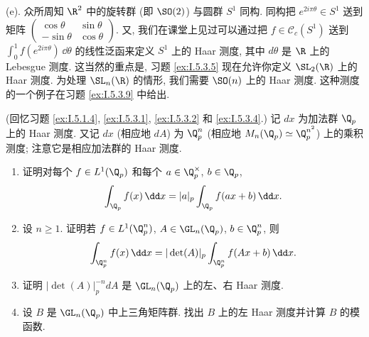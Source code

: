 \begin{solution}
(e). 众所周知 $\R^2$ 中的旋转群 (即 $\SO(2)$) 与圆群 $S^1$ 同构. 同构把 $e^{2i\pi\theta} \in S^1$ 送到矩阵 $\begin{pmatrix} \cos\theta & \sin\theta \\ -\sin\theta & \cos\theta \end{pmatrix}$. 又, 我们在课堂上见过可以通过把 $f \in \mathcal{C}_c(S^1)$ 送到 $\int_0^1 f(e^{2i\pi\theta})\,\dd\theta$ 的线性泛函来定义 $S^1$ 上的 Haar 测度, 其中 $d\theta$ 是 $\R$ 上的 Lebesgue 测度.
这当然的重点是, 习题 \ref{ex:I.5.3.5} 现在允许你定义 $\SL_2(\R)$ 上的 Haar 测度. 为处理 $\SL_n(\R)$ 的情形, 我们需要 $\SO(n)$ 上的 Haar 测度. 这种测度的一个例子在习题 \ref{ex:I.5.3.9} 中给出.
\end{solution}

\begin{exercise}[$\GL_n(\Q_p)$ 上的 Haar 测度]
\label{ex:I.5.3.8}
(回忆习题 \ref{ex:I.5.1.4}, \ref{ex:I.5.3.1}, \ref{ex:I.5.3.2} 和 \ref{ex:I.5.3.4}.) 记 $dx$ 为加法群 $\Q_p$ 上的 Haar 测度. 又记 $dx$ (相应地 $dA$) 为 $\Q_p^n$ (相应地 $M_n(\Q_p) \simeq \Q_p^{n^2}$) 上的乘积测度; 注意它是相应加法群的 Haar 测度.
\begin{enumerate}
\item[(a)] 证明对每个 $f \in L^1(\Q_p)$ 和每个 $a \in \Q_p^{\times}$, $b \in \Q_p$,
\[
\int_{\Q_p}f(x)\,\dd x = |a|_p\int_{\Q_p}f(ax + b)\,\dd x.
\]
\item[(b)] 设 $n \geq 1$. 证明若 $f \in L^1(\Q_p^n)$, $A \in \GL_n(\Q_p)$, $b \in \Q_p^n$, 则
\[
\int_{\Q_p^n}f(x)\,\dd x = |\det(A)|_p\int_{\Q_p^n}f(Ax + b)\,\dd x.
\]
\item[(c)] 证明 $|\det(A)|_p^{-n}dA$ 是 $\GL_n(\Q_p)$ 上的左、右 Haar 测度.
\item[(d)] 设 $B$ 是 $\GL_n(\Q_p)$ 中上三角矩阵群. 找出 $B$ 上的左 Haar 测度并计算 $B$ 的模函数.
\end{enumerate}
\end{exercise}

